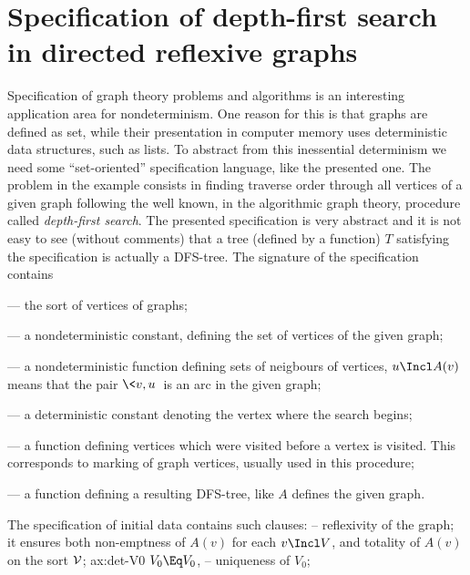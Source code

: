 \documentclass[leqno]{article}
\begin{document}
\section{Specification of depth-first search in directed reflexive graphs}

Specification of graph theory problems and algorithms is an interesting
application area for nondeterminism. One reason for this is
that graphs are defined as set, while their presentation in computer memory
uses deterministic data structures, such as lists. To abstract from this
inessential determinism we need some ``set-oriented''
specification language, like the presented one. The problem in the example
consists in finding traverse order through all vertices of a given graph
following the well known, in the algorithmic graph theory, procedure called {\em
depth-first search}. The presented specification is very abstract and it is
not easy to see (without comments) that a tree (defined by a function)
$T$ satisfying the specification is actually a DFS-tree.
%
The signature of the  specification contains
\begin{description}\MyLPar
\item[\(\cal V\)] --- the sort of vertices of graphs;
\item[\(V:\ \to \cal V\)] --- a nondeterministic constant, defining the set of
vertices of the given graph; 
\item[\(A:\cal V\to\cal V\)] --- a nondeterministic function defining sets
of neigbours of vertices, \(u\Incl A(v)\) means that the pair \(\<v,u\>\) is
an arc in the given graph;
\item[\(V_0:\ \to\cal V\)] --- a deterministic constant denoting the vertex
where the search begins;
\item[\(M:\cal V\to\cal V\)] --- a function defining vertices which were
visited before a vertex is visited. This corresponds to marking of graph
vertices, usually used in this procedure; 
\item[\(T:\cal V\to\cal V\)] --- a function defining a resulting DFS-tree,
like $A$ defines the given graph.
\end{description}
The specification of initial data contains such clauses:
   -- reflexivity of the graph; it ensures both
   non-emptness of \(A(v)\) for each \(v\Incl V\), and totality of \(A(v)\) on
the sort \(\cal V\); 
 {ax:det-V0} {$V_0\Eq V_0$,
   -- uniqueness of \(V_0\); }
\end{document}
